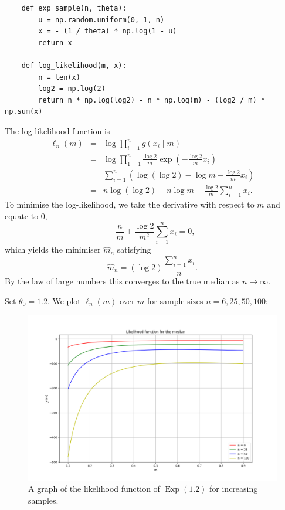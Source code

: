 \documentclass{article}
\begin{document}
\begin{verbatim}
    def exp_sample(n, theta):
        u = np.random.uniform(0, 1, n)
        x = - (1 / theta) * np.log(1 - u)
        return x

    def log_likelihood(m, x):
        n = len(x)
        log2 = np.log(2)
        return n * np.log(log2) - n * np.log(m) - (log2 / m) * np.sum(x)
\end{verbatim}

The log-likelihood function is
\begin{eqnarray*}
    \ell_n(m) & = & \log\prod_{i=1}^n g(x_i \mid m) \\
              & = & \log\prod_{1=1}^n \frac{\log2}{m}\exp\left(-\frac{\log2}{m}x_i\right) \\
              & = & \sum_{i=1}^n\left(\log(\log2) - \log m - \frac{\log 2}{m}x_i \right) \\
              & = & n\log(\log 2) - n\log m - \frac{\log2}{m} \sum_{i=1}^n x_i.
\end{eqnarray*}
To minimise the log-likelihood, we take the derivative with respect to \(m\) and equate to \(0\),
\[ -\frac{n}{m} + \frac{\log 2}{m^2}\sum_{i=1}^n x_i = 0, \]
which yields the minimiser \(\hat{m}_n\) satisfying
\[ \hat{m}_n = (\log 2)\frac{\sum_{i=1}^n x_i}{n}. \]
By the law of large numbers this converges to the true median as \(n \to \infty\).

Set \(\theta_0 = 1.2\). We plot \(\ell_n(m)\) over \(m\) for sample sizes \(n = 6, 25, 50, 100\):
\begin{figure}
    \centering
    \includegraphics[width=1.0\linewidth]{images/exp_likelihood.png}
    \caption{A graph of the likelihood function of \(\mathop{\mathrm{Exp}}(1.2)\) for increasing samples.}
\end{figure}
\end{document}
